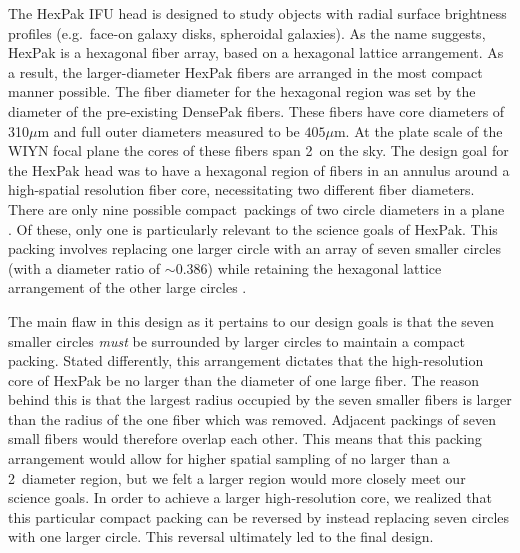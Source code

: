 The HexPak IFU head is designed to study objects with radial surface
brightness profiles (e.g.\ face-on galaxy disks, spheroidal galaxies).  As the
name suggests, HexPak is a hexagonal fiber array, based on a hexagonal lattice
arrangement.  As a result, the larger-diameter HexPak fibers are arranged in
the most compact manner possible.  The fiber diameter for the hexagonal region
was set by the diameter of the pre-existing DensePak fibers.  These fibers
have core diameters of 310$\mu$m and full outer diameters measured to be
$405\mu$m.  At the plate scale of the WIYN focal plane the cores of these
fibers span 2\ on the sky.  The design goal for the HexPak head was to
have a hexagonal region of fibers in an annulus around a high-spatial
resolution fiber core, necessitating two different fiber diameters.  There are
only nine possible compact\footnotemark\ packings of two circle diameters in a
plane \citep{Kennedy06}.    Of these, only one is
particularly relevant to the science goals of HexPak.  This packing involves
replacing one larger circle with an array of seven smaller circles (with a
diameter ratio of $\sim$0.386) while retaining the hexagonal lattice
arrangement of the other large circles \citep[see Figure~1.e][]{Kennedy06}.


The main flaw in this design as it pertains to our design goals is that the
seven smaller circles \emph{must} be surrounded by larger circles to maintain
a compact packing.  Stated differently, this arrangement dictates that the
high-resolution core of HexPak be no larger than the diameter of one large
fiber.  The reason behind this is that the largest radius occupied by the
seven smaller fibers is larger than the radius of the one fiber which was
removed.  Adjacent packings of seven small fibers would therefore overlap each
other.  This means that this packing arrangement would allow for higher
spatial sampling of no larger than a 2\ diameter region, but we felt a
larger region would more closely meet our science goals.  In order to achieve
a larger high-resolution core, we realized that this particular compact
packing can be reversed by instead replacing seven circles with one larger
circle.  This reversal ultimately led to the final design.


